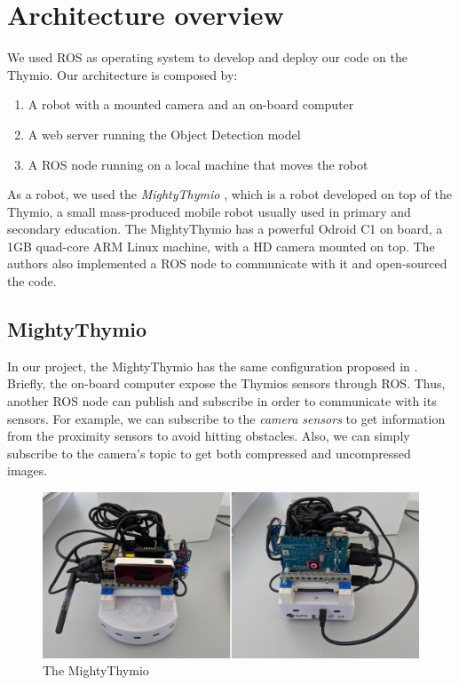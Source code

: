 \documentclass[letterpaper, 10 pt, conference]{ieeeconf}  %
\begin{document}
\section{Architecture overview}
We used ROS\cite{ROS} as operating system to develop and deploy our code on the Thymio. Our architecture is composed by:
\begin{enumerate}
	\item A robot with a mounted camera and an on-board computer
	\item A web server running the Object Detection model
	\item A ROS node running on a local machine that moves the robot
\end{enumerate}
As a robot, we used the \emph{MightyThymio} \cite{guzzi2018eaai}, which is a robot developed on top of the Thymio, a small mass-produced mobile robot usually used in primary and secondary education. The MightyThymio has a powerful Odroid C1 on board, a 1GB quad-core ARM Linux machine, with a HD camera mounted on top. The authors also implemented a ROS node to communicate with it and open-sourced the code.

\subsection*{MightyThymio}

In our project, the MightyThymio has the same configuration proposed in \cite{guzzi2018eaai}. Briefly, the on-board computer expose the Thymios sensors through ROS. Thus, another ROS node can publish and subscribe in order to communicate with its sensors. For example, we can subscribe to the \emph{camera sensors} to get information from the proximity sensors to avoid hitting obstacles. Also, we can simply subscribe to the camera's topic to get both compressed and uncompressed images. 

\begin{figure}[H]
\centering
\includegraphics[width=\linewidth]{assembled_myt}	
\caption{The MightyThymio}
\end{figure}
\end{document}
